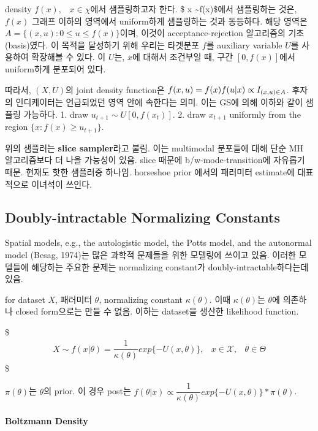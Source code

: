 \documentclass[
]{book}
\begin{document}
density \(f(x), \; \; \; x \in \chi\)에서 샘플링하고자 한다. \$ x \sim f(x)\$에서 샘플링하는 것은, \(f(x)\) 그래프 이하의 영역에서 uniform하게 샘플링하는 것과 동등하다. 해당 영역은 \(A = \{ (x,u): 0 \le u \le f(x) \}\)이며, 이것이 acceptance-rejection 알고리즘의 기초(basis)였다. 이 목적을 달성하기 위해 우리는 타겟분포 \(f\)를 auxiliary variable \(U\)를 사용하여 확장해볼 수 있다. 이 \(U\)는, \(x\)에 대해서 조건부일 때, 구간 \([0, f(x)]\)에서 uniform하게 분포되어 있다.

따라서, \((X, U)\)의 joint density function은 \(f(x,u)=f(x)f(u \rvert x) \propto I_{(x,u)\in \textit A}\). 후자의 인디케이터는 언급되었던 영역 안에 속한다는 의미. 이는 GS에 의해 이하와 같이 샘플링 가능하다.
1. draw \(u_{t+1} \sim U[0, f(x_t)]\).
2. draw \(x_{t+1}\) uniformly from the region \(\{ x: f(x) \ge u_{t+1} \}\).

위의 샘플러는 \textbf{slice sampler}라고 불림. 이는 multimodal 분포들에 대해 단순 MH 알고리즘보다 더 나을 가능성이 있음. slice 때문에 b/w-mode-transition에 자유롭기 때문. 현재도 핫한 샘플러중 하나임. horseshoe prior 에서의 패러미터 estimate에 대표적으로 이녀석이 쓰인다.

\hypertarget{doubly-intractable-normalizing-constants}{%
\subsection{Doubly-intractable Normalizing Constants}\label{doubly-intractable-normalizing-constants}}

Spatial models, e.g., the autologistic model, the Potts model, and the autonormal model (Besag, 1974)는 많은 과학적 문제들을 위한 모델링에 쓰이고 있음. 이러한 모델들에 해당하는 주요한 문제는 normalizing constant가 doubly-intractable하다는데 있음.

for dataset \(X\), 패러미터 \(\theta\), normalizing constant \(\kappa (\theta)\). 이때 \(\kappa (\theta)\)는 \(\theta\)에 의존하나 closed form으로는 만들 수 없음. 이하는 dataset을 생산한 likelihood function.

\$
\begin{align*}
X \sim f(x \vert \theta) = \dfrac{1}{\kappa (\theta)} exp \{ -U(x, \theta) \}, &x \in \mathcal{X}, &\theta \in \Theta
\end{align*}
\$

\(\pi(\theta)\)는 \(\theta\)의 prior. 이 경우 post는 \(f(\theta \vert x) \propto \dfrac{1}{\kappa (\theta)} exp \{ -U(x, \theta) \} \ast \pi(\theta)\).

\hypertarget{boltzmann-density}{%
\paragraph{Boltzmann Density}\label{boltzmann-density}}
\end{document}
